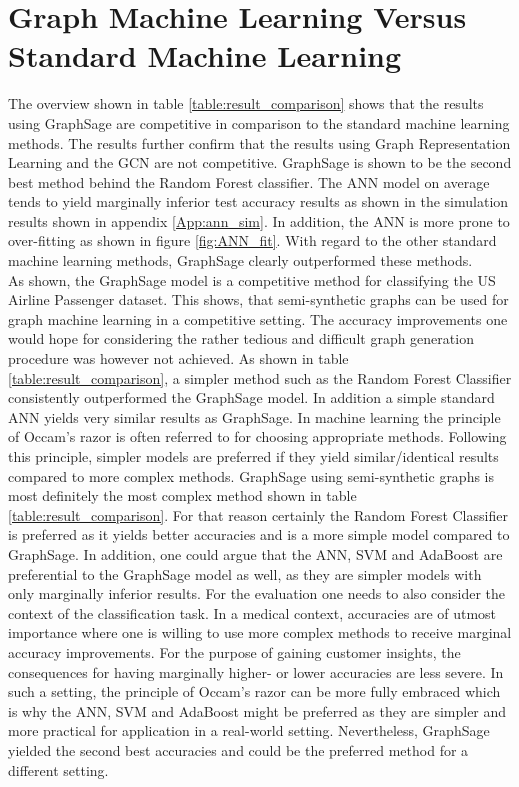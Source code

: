  \section{Graph Machine Learning Versus Standard Machine Learning}

  The overview shown in table \ref{table:result_comparison} shows that the
  results using GraphSage are competitive in comparison to the standard machine
  learning methods. The results further confirm that the results using Graph
  Representation Learning and the GCN are not competitive. GraphSage is shown
  to be the second best method behind the Random Forest classifier. The ANN
  model on average tends to yield marginally inferior test accuracy results as
  shown in the simulation results shown in appendix \ref{App:ann_sim}. In
  addition, the ANN is more prone to over-fitting as shown in figure
  \ref{fig:ANN_fit}. With regard to the other standard machine
  learning methods, GraphSage clearly outperformed these methods. \\

  \noindent As shown, the GraphSage model is a competitive method for 
  classifying the US Airline Passenger dataset. This shows, that semi-synthetic
  graphs can be used for graph machine learning in a competitive setting. The
  accuracy improvements one would hope for considering the rather tedious and
  difficult graph generation procedure was however not achieved. As shown in
  table \ref{table:result_comparison}, a simpler method such as the Random
  Forest Classifier consistently outperformed the GraphSage model. In addition
  a simple standard ANN yields very similar results as GraphSage. In machine 
  learning the principle of Occam's razor is often referred to for choosing 
  appropriate methods. Following this principle, simpler models are preferred if 
  they yield similar/identical results compared to more complex methods.
  GraphSage using semi-synthetic graphs is most definitely the most complex 
  method shown in table \ref{table:result_comparison}. For that reason certainly 
  the Random Forest Classifier is preferred as it yields better accuracies and
  is a more simple model compared to GraphSage. In addition, one could argue
  that the ANN, SVM and AdaBoost are preferential to the GraphSage model as
  well, as they are simpler models with only marginally inferior results. For
  the evaluation one needs to also consider the context of the classification
  task. In a medical context, accuracies are of utmost importance where one is
  willing to use more complex methods to receive marginal accuracy improvements. 
  For the purpose of gaining customer insights, the consequences for having
  marginally higher- or lower accuracies are less severe. In such a setting,
  the principle of Occam's razor can be more fully embraced which is why the
  ANN, SVM and AdaBoost might be preferred as they are simpler and more
  practical for application in a real-world setting. Nevertheless, GraphSage
  yielded the second best accuracies and could be the preferred method for a
  different setting.  





